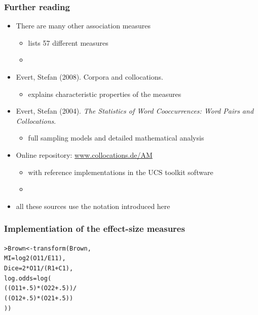 \documentclass[handout,notes=show,t]{beamer} %
\begin{document}
\begin{frame}
  \frametitle{Further reading}

  \begin{itemize}
  \item There are many other association measures
    \begin{itemize}
    \item \citet{Pecina:05} lists 57 different measures
    \item[]
    \end{itemize}
  \item Evert, Stefan (2008). Corpora and collocations.\\
    \nocite{Evert:08}
    \begin{itemize}
    \item explains characteristic properties of the measures
    \end{itemize}
  \item Evert, Stefan (2004). \emph{The Statistics of Word Cooccurrences: Word
      Pairs and Collocations}.\\
    \nocite{Evert:04phd}
    \begin{itemize}
    \item full sampling models and detailed mathematical analysis
    \end{itemize}
  \item Online repository: \h{\url{www.collocations.de/AM}}
    \begin{itemize}
    \item with reference implementations in the UCS toolkit software
    \item[]
    \end{itemize}
  \item[\hand] all these sources use the notation introduced here
  \end{itemize}
\end{frame}

\begin{frame}[fragile]
  \frametitle{Implementiation of the effect-size measures}

  \begin{alltt}
\pause
> Brown <- transform(Brown,
  MI = log2(O11/E11),
  Dice = 2 * O11 / (R1 + C1),
  log.odds = log(
    ((O11 + .5) * (O22 + .5)) /
    ((O12 + .5) * (O21 + .5))
  ))

  \end{alltt}
\end{frame}
\end{document}
